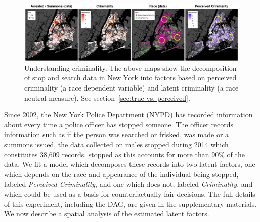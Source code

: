 \begin{figure}[!t]
\begin{center}
\centerline{\includegraphics[width=\textwidth]{stop_and_frisk_graphs.png}}
\caption{Understanding criminality. The above maps show the
  decomposition of stop and search data in New York into factors based
  on perceived criminality (a race dependent variable) and latent
  criminality (a race neutral measure). See
  section~\ref{sec:true-vs.-perceived}.  \label{figure.criminality}\vspace{-7ex}}
\end{center}
\end{figure}

Since 2002, the New York Police Department (NYPD) has recorded
information about every time a police officer has stopped someone. The
officer records information such as if the person was searched or
frisked, %
was made or a summons issued, %
the data collected on males stopped during 2014 which constitutes
38,609 records. %
stopped as this accounts for more than $90\%$ of the data.  We fit a
model which decomposes these records into two latent factors, one
which depends on the race and appearance of the individual being
stopped, labeled \emph{Perceived Criminality}, and one which does not,
labeled \emph{Criminality}, and which could be used as a basis for
counterfactually fair decisions. The full details of this experiment,
including the DAG, are given in the supplementary materials. We now
describe a spatial analysis of the estimated latent factors.

